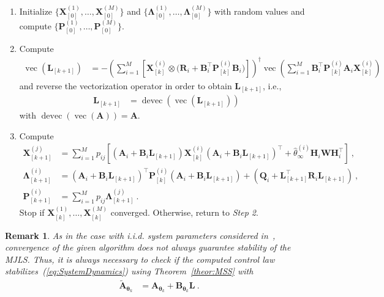 \documentclass[preprint,1p,11pt]{IR-Template/ISAS_IR}
\newcommand{\rv}[1]{\ensuremath{{\boldsymbol{#1}}}}
\newcommand{\mat}[1]{{\ensuremath{{\mathbf{#1}}}}}
\newcommand{\pinv}{^\dagger}
\newcommand{\tr}{^{\top}}
\DeclareMathOperator{\vvec}{vec}
\renewcommand{\vec}[1]{\vvec\klammer{#1}}
\DeclareMathOperator{\ddevec}{devec}
\newcommand{\devec}[1]{\ddevec\klammer{#1}}
\newcommand{\klammer}[1]{\left( #1 \right)}
\newcommand{\bklammer}[1]{\left[ #1 \right]}
\newcommand{\kron}[2]{{#1 \otimes #2}}
\newcommand{\Asys}[1]{\mat{A}_{#1}}
\newcommand{\Bsys}[1]{\mat{B}_{#1}}
\newcommand{\Qsys}[1]{\mat{Q}_{#1}}
\newcommand{\Rsys}[1]{\mat{R}_{#1}}
\newcommand{\Hsys}[1]{\mat{H}_{#1}}
\newcommand{\wCov}{\mat{W}}
\newcommand{\mode}[1]{\rv{\theta}_{#1}}
\newcommand{\modeest}[2]{\widehat{\theta}^{(#1)}_{#2}}
\newcommand{\transitionprob}[1]{p_{#1}}
\newcommand{\Xsysest}[2]{\mat{X}^{(#1)}_{#2}}
\newcommand{\ControlLaw}{\mat{L}}
\newcommand{\NumModes}{M}
\newcommand{\Pest}[2]{\mat{P}^{(#1)}_{#2}}
\newcommand{\Lagrange}[2]{\mat{\Lambda}^{(#1)}_{#2}}
\newtheorem{remark}{Remark}
\begin{document}
\begin{enumerate}[leftmargin = 1.4cm,rightmargin = 1cm,label= \hspace{1cm}\emph{Step \arabic*}:]
\item Initialize $\{\Xsysest{1}{[0]},\dots,\Xsysest{\NumModes}{[0]}\}$ and $\{\Lagrange{1}{[0]},\dots,\Lagrange{\NumModes}{[0]}\}$ with random values and compute $\allowbreak\{\Pest{1}{[0]}, \dots ,\Pest{\NumModes}{[0]}\}$.

\item Compute
\begin{align*}
\vec{\ControlLaw_{[k+1]}}
	&=
	-\klammer{\sum\limits_{i=1}^{\NumModes}\bklammer{\kron{\Xsysest{i}{[k]}}{(\Rsys{i}+\Bsys{i}\tr\Pest{i}{[k]}\Bsys{i}})}}\pinv \vec{\sum\limits_{i=1}^{\NumModes} \Bsys{i}\tr\Pest{i}{[k]}\Asys{i}\Xsysest{i}{[k]}}
\end{align*}
and reverse the vectorization operator in order to obtain $\ControlLaw_{[k+1]}$, i.e.,
\begin{align*}
\ControlLaw_{[k+1]}
	&=
	\devec{\vec{\ControlLaw_{[k+1]}}}
\end{align*}
with $\devec{\vec{\mat{A}}} = \mat{A}$.

\item Compute
\begin{align*}
\Xsysest{j}{[k+1]}
	&=
	\sum\limits_{i=1}^{\NumModes}\transitionprob{ij}\bklammer{(\Asys{i}+\Bsys{i}\ControlLaw_{[k+1]})\Xsysest{i}{[k]}(\Asys{i}+\Bsys{i}\ControlLaw_{[k+1]})\tr + \modeest{i}{\infty}\Hsys{i}\wCov\Hsys{i}\tr}\ ,\\
\Lagrange{i}{[k+1]}
	&=
	(\Asys{i}+\Bsys{i}\ControlLaw_{[k+1]})\tr \Pest{i}{[k]} (\Asys{i}+\Bsys{i}\ControlLaw_{[k+1]}) + (\Qsys{i}+\ControlLaw_{[k+1]}\tr\Rsys{i}\ControlLaw_{[k+1]})\ ,\\
\Pest{i}{[k+1]}
	&=
	\sum\limits_{i=1}^{\NumModes} \transitionprob{ij} \Lagrange{j}{[k+1]}\ .
\end{align*}
Stop if $\Xsysest{1}{[k]},\dots,\Xsysest{\NumModes}{[k]}$ converged. Otherwise, return to \emph{Step 2}.
\end{enumerate}

\begin{remark}
As in the case with i.i.d. system parameters considered in~\cite{DeKoning_1992}, convergence of the given algorithm does not always guarantee stability of the MJLS. Thus, it is always necessary to check if the computed control law stabilizes~(\ref{eq:SystemDynamics}) using Theorem~\ref{theor:MSS} with
\begin{align*}
\widetilde{\mat{A}}_{\mode{k}}
	&=
	\Asys{\mode{k}} + \Bsys{\mode{k}}\ControlLaw\ .
\end{align*}
\end{remark}
\end{document}
